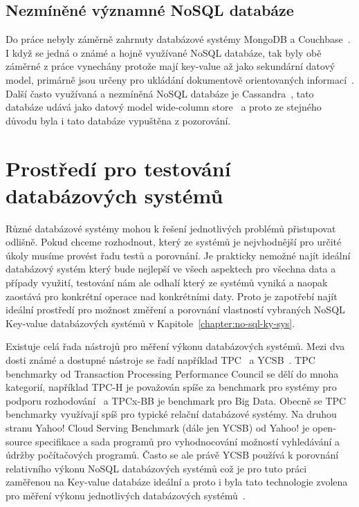 \documentclass[czech,master,dept460,male,csharp,cpdeclaration]{diploma}
\begin{document}
	\section {Nezmíněné významné NoSQL databáze}
	
		Do práce nebyly záměrně zahrnuty databázové systémy MongoDB a Couchbase~\cite{mongodb,couchbase}. I když se jedná o známé a hojně využívané NoSQL databáze, tak byly obě záměrné z práce vynechány protože mají key-value až jako sekundární datový model, primárně jsou určeny pro ukládání dokumentově orientovaných informací~\cite{documentdb}. Další často využívaná a nezmíněná NoSQL databáze je Cassandra~\cite{cassandra}, tato databáze udává jako datový model wide-column store~\cite{widecolumnstore} a proto ze stejného důvodu byla i tato databáze vypuštěna z pozorování.
	
	\chapter{Prostředí pro testování databázových systémů}
	
	Různé databázové systémy mohou k řešení jednotlivých problémů přistupovat odlišně. Pokud chceme rozhodnout, který ze systémů je nejvhodnější pro určité úkoly musíme provést řadu testů a porovnání. Je prakticky nemožné najít ideální databázový systém který bude nejlepší ve všech aspektech pro všechna data a případy využití, testování nám ale odhalí který ze systémů vyniká a naopak zaostává pro konkrétní operace nad konkrétními daty. Proto je zapotřebí najít ideální prostředí pro možnost změření a porovnání vlastností vybraných NoSQL Key-value databázových systémů v Kapitole~\ref{chapter:no-sql-ky-sys}.
	
	Existuje celá řada nástrojů pro měření výkonu databázových systémů. Mezi dva dosti známé a dostupné nástroje se řadí například TPC~\cite{tpc} a YCSB~\cite{ycsb}. TPC benchmarky od Transaction Processing Performance Council se dělí do mnoha kategorií, například TPC-H je považován spíše za benchmark pro systémy pro podporu rozhodování~\cite{dss} a TPCx-BB je benchmark pro Big Data. Obecně se TPC benchmarky využívají spíš pro typické relační databázové systémy. Na druhou stranu Yahoo! Cloud Serving Benchmark (dále jen YCSB) od Yahoo! je open-source specifikace a sada programů pro vyhodnocování možností vyhledávání a údržby počítačových programů. Často se ale právě YCSB používá k porovnání relativního výkonu NoSQL databázových systémů což je pro tuto práci zaměřenou na Key-value databáze ideální a proto i byla tato technologie zvolena pro měření výkonu jednotlivých databázových systémů~\cite{benchmark-pdf-1, benchmark-pdf-2}.
	
\end{document}
